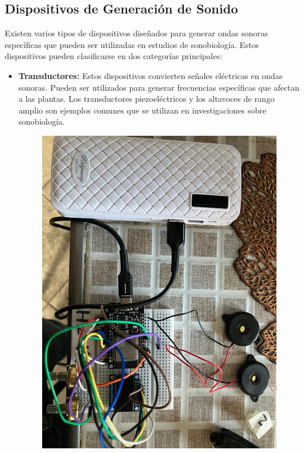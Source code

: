 \documentclass[twocolumn]{article}
\begin{document}
\subsection{Dispositivos de Generación de Sonido}

Existen varios tipos de dispositivos diseñados para generar ondas sonoras específicas que pueden ser utilizadas en estudios de sonobiología. Estos dispositivos pueden clasificarse en dos categorías principales:

\begin{itemize}
    \item \textbf{Transductores:} Estos dispositivos convierten señales eléctricas en ondas sonoras. Pueden ser utilizados para generar frecuencias específicas que afectan a las plantas. Los transductores piezoeléctricos y los altavoces de rango amplio son ejemplos comunes que se utilizan en investigaciones sobre sonobiología.
    \begin{figure}[!h]
        \centering
        \includegraphics[width=\linewidth]{imagenes/1faee7cd-2d65-47b5-9463-7e09d6f5016d.jpeg}       

\end{figure}
\end{itemize}
\end{document}
